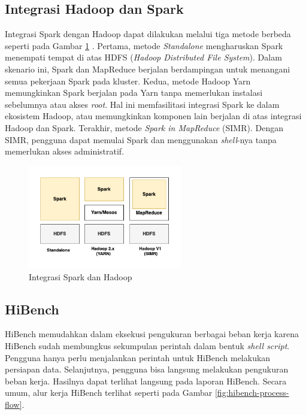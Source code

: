 \subsection{Integrasi Hadoop dan Spark}
Integrasi Spark dengan Hadoop dapat dilakukan melalui tiga metode berbeda seperti pada Gambar \ref{fig:spark-x-hadoop}  \cite{ApacheSparkIntroduction}. Pertama, metode \textit{Standalone} mengharuskan Spark menempati tempat di atas HDFS (\textit{Hadoop Distributed File System}). Dalam skenario ini, Spark dan MapReduce berjalan berdampingan untuk menangani semua pekerjaan Spark pada kluster. Kedua, metode Hadoop Yarn memungkinkan Spark berjalan pada Yarn tanpa memerlukan instalasi sebelumnya atau akses \textit{root}. Hal ini memfasilitasi integrasi Spark ke dalam ekosistem Hadoop, atau memungkinkan komponen lain berjalan di atas integrasi Hadoop dan Spark. Terakhir, metode \textit{Spark in MapReduce} (SIMR). Dengan SIMR, pengguna dapat memulai Spark dan menggunakan \textit{shell}-nya tanpa memerlukan akses administratif. 
\begin{figure}[h]
    \centering
    \includegraphics[width=0.6\textwidth]{figures/ch02/sparkxhadoop}
    \caption{Integrasi Spark dan Hadoop}
    \label{fig:spark-x-hadoop}
\end{figure}

\subsection{HiBench}
HiBench memudahkan dalam eksekusi pengukuran berbagai beban kerja karena HiBench sudah membungkus sekumpulan perintah dalam bentuk \textit{shell script}\cite{samadiPerformanceComparisonHadoop2018}. Pengguna hanya perlu menjalankan perintah untuk HiBench melakukan persiapan data. Selanjutnya, pengguna bisa langsung melakukan pengukuran beban kerja. Hasilnya dapat terlihat langsung pada laporan HiBench. Secara umum, alur kerja HiBench terlihat seperti pada Gambar \ref{fig:hibench-process-flow}.

